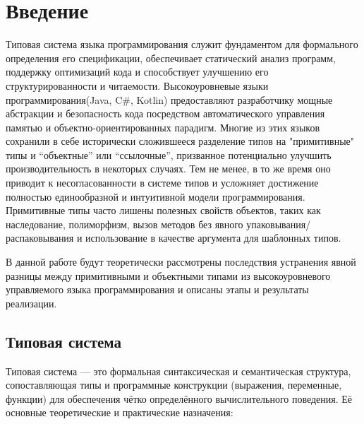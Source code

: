 \section{Введение}
\label{sec:Chapter0} 
\onehalfspacing %

Типовая система языка программирования служит фундаментом для формального определения его спецификации, обеспечивает статический анализ программ,
поддержку оптимизаций кода и способствует улучшению его структурированности и читаемости.
Высокоуровневые языки программирования(Java, C\#, Kotlin) предоставляют разработчику мощные абстракции и безопасность кода посредством автоматического
управления памятью и объектно-ориентированных парадигм. Многие из этих языков сохранили в себе исторически сложившееся разделение типов на "примитивные" типы и ``объектные''
или ``ссылочные'', призванное потенциально улучшить производительность в некоторых случаях. Тем не менее, в то же время оно приводит к несогласованности в системе типов и
усложняет достижение полностью единообразной и интуитивной модели программирования. Примитивные типы часто лишены полезных свойств объектов, таких как наследование,
полиморфизм, вызов методов без явного упаковывания/распаковывания и использование в качестве аргумента для шаблонных типов.

В данной работе будут теоретически рассмотрены последствия устранения явной разницы между примитивными и объектными типами из высокоуровневого управляемого языка
программирования и описаны этапы и результаты реализации.

\subsection{Типовая система}

Типовая система — это формальная синтаксическая и семантическая структура, сопоставляющая типы и программные конструкции (выражения, переменные, функции) для обеспечения чётко определённого вычислительного поведения. Её основные теоретические и практические назначения:

